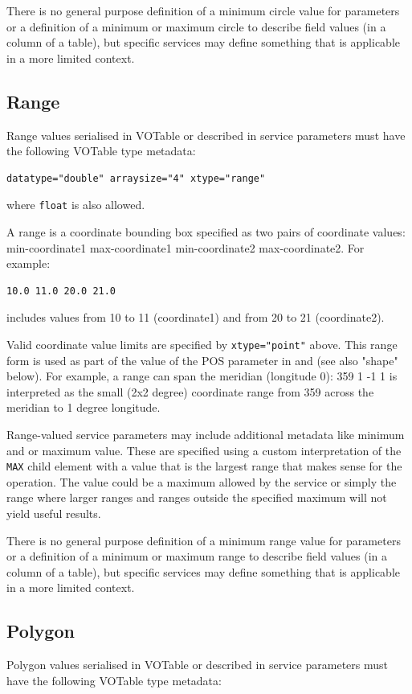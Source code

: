 \documentclass[11pt,letter]{ivoa}
\begin{document}
There is no general purpose definition of a minimum circle value for parameters or
a definition of a minimum or maximum circle to describe field values (in a column
of a table), but specific services may define something that is applicable in a
more limited context.

\subsection{Range}
Range values serialised in VOTable or described in service parameters must have the following VOTable type metadata:
\begin{verbatim}
datatype="double" arraysize="4" xtype="range"
\end{verbatim}
\noindent where \verb|float| is also allowed.

A range is a coordinate bounding box specified
as two pairs of coordinate values: min-coordinate1 max-coordinate1 min-coordinate2 max-coordinate2.
For example:

\begin{verbatim}
10.0 11.0 20.0 21.0
\end{verbatim}

\noindent
includes values from 10 to 11 (coordinate1) and from 20 to 21 (coordinate2).

Valid coordinate value limits are specified by \verb|xtype="point"| above.
This range form is used as part of the value of the POS parameter in
\citep{2015ivoa.spec.1223D} and \citep{2017ivoa.spec.0517B} (see also "shape" below).
For example, a range can span the meridian (longitude 0): 359 1 -1 1 is interpreted
as the small (2x2 degree) coordinate range from 359 across the meridian to 1 degree
longitude.

Range-valued service parameters may include additional metadata like minimum and
or maximum value. These are specified using a custom interpretation of the
\verb|MAX| child element with a value that is the largest range that makes sense
for the operation. The value could be a maximum allowed by the service or simply
the range where larger ranges and ranges outside the specified maximum will not yield
useful results.

There is no general purpose definition of a minimum range value for parameters or
a definition of a minimum or maximum range to describe field values (in a column
of a table), but specific services may define something that is applicable in a
more limited context.

\subsection{Polygon}
Polygon values serialised in VOTable or described in service parameters must have the
following VOTable type metadata:
\end{document}
